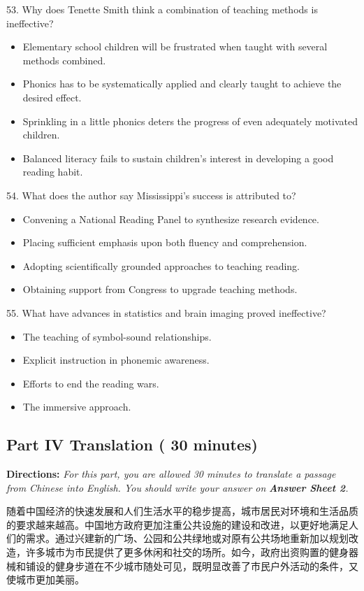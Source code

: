 \documentclass[UTF8,11pt]{ctexart}
\begin{document}
53. Why does Tenette Smith think a combination of teaching methods is ineffective?


\begin{itemize}[leftmargin=2em,itemsep=.2em,topsep=.4em]\item[A.] Elementary school children will be frustrated when taught with several methods combined.
\item[B.] Phonics has to be systematically applied and clearly taught to achieve the desired effect.
\item[C.] Sprinkling in a little phonics deters the progress of even adequately motivated children.
\item[D.] Balanced literacy fails to sustain children’s interest in developing a good reading habit.
\end{itemize}

54. What does the author say Mississippi’s success is attributed to?


\begin{itemize}[leftmargin=2em,itemsep=.2em,topsep=.4em]\item[A.] Convening a National Reading Panel to synthesize research evidence.
\item[B.] Placing sufficient emphasis upon both fluency and comprehension.
\item[C.] Adopting scientifically grounded approaches to teaching reading.
\item[D.] Obtaining support from Congress to upgrade teaching methods.
\end{itemize}

55. What have advances in statistics and brain imaging proved ineffective?


\begin{itemize}[leftmargin=2em,itemsep=.2em,topsep=.4em]\item[A.] The teaching of symbol-sound relationships.
\item[B.] Explicit instruction in phonemic awareness.
\item[C.] Efforts to end the reading wars.
\item[D.] The immersive approach.
\end{itemize}

\subsection*{\textbf{Part IV Translation} \textbf{( 30 minutes)}}


\textbf{Directions: }\textit{For this part, you are allowed 30 minutes to translate a passage from Chinese into English. You} \textit{should write your answer on }\textbf{\textit{Answer Sheet 2}}\textit{.}


随着中国经济的快速发展和人们生活水平的稳步提高，城市居民对环境和生活品质的要求越来越高。中国地方政府更加注重公共设施的建设和改进，以更好地满足人们的需求。通过兴建新的广场、公园和公共绿地或对原有公共场地重新加以规划改造，许多城市为市民提供了更多休闲和社交的场所。如今，政府出资购置的健身器械和铺设的健身步道在不少城市随处可见，既明显改善了市民户外活动的条件，又使城市更加美丽。
\end{document}

